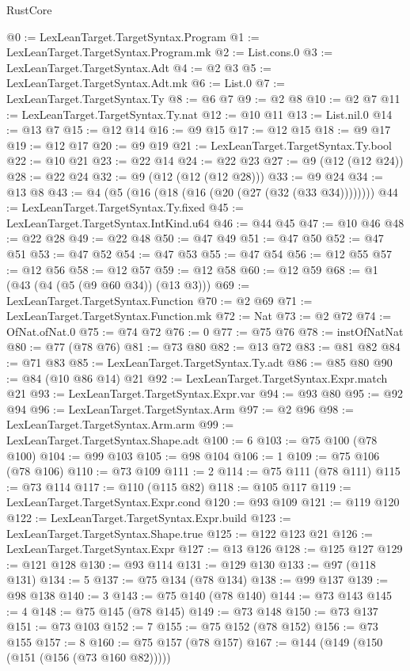 \begin{lexlean}{RustCore}
\begin{coremodule}
@0 := LexLeanTarget.TargetSyntax.Program
@1 := LexLeanTarget.TargetSyntax.Program.mk
@2 := List.cons.{0}
@3 := LexLeanTarget.TargetSyntax.Adt
@4 := @2 @3
@5 := LexLeanTarget.TargetSyntax.Adt.mk
@6 := List.{0}
@7 := LexLeanTarget.TargetSyntax.Ty
@8 := @6 @7
@9 := @2 @8
@10 := @2 @7
@11 := LexLeanTarget.TargetSyntax.Ty.nat
@12 := @10 @11
@13 := List.nil.{0}
@14 := @13 @7
@15 := @12 @14
@16 := @9 @15
@17 := @12 @15
@18 := @9 @17
@19 := @12 @17
@20 := @9 @19
@21 := LexLeanTarget.TargetSyntax.Ty.bool
@22 := @10 @21
@23 := @22 @14
@24 := @22 @23
@27 := @9 (@12 (@12 @24))
@28 := @22 @24
@32 := @9 (@12 (@12 (@12 @28)))
@33 := @9 @24
@34 := @13 @8
@43 := @4 (@5 (@16 (@18 (@16 (@20 (@27 (@32 (@33 @34))))))))
@44 := LexLeanTarget.TargetSyntax.Ty.fixed
@45 := LexLeanTarget.TargetSyntax.IntKind.u64
@46 := @44 @45
@47 := @10 @46
@48 := @22 @28
@49 := @22 @48
@50 := @47 @49
@51 := @47 @50
@52 := @47 @51
@53 := @47 @52
@54 := @47 @53
@55 := @47 @54
@56 := @12 @55
@57 := @12 @56
@58 := @12 @57
@59 := @12 @58
@60 := @12 @59
@68 := @1 (@43 (@4 (@5 (@9 @60 @34)) (@13 @3)))
@69 := LexLeanTarget.TargetSyntax.Function
@70 := @2 @69
@71 := LexLeanTarget.TargetSyntax.Function.mk
@72 := Nat
@73 := @2 @72
@74 := OfNat.ofNat.{0}
@75 := @74 @72
@76 := 0
@77 := @75 @76
@78 := instOfNatNat
@80 := @77 (@78 @76)
@81 := @73 @80
@82 := @13 @72
@83 := @81 @82
@84 := @71 @83
@85 := LexLeanTarget.TargetSyntax.Ty.adt
@86 := @85 @80
@90 := @84 (@10 @86 @14) @21
@92 := LexLeanTarget.TargetSyntax.Expr.match @21
@93 := LexLeanTarget.TargetSyntax.Expr.var
@94 := @93 @80
@95 := @92 @94
@96 := LexLeanTarget.TargetSyntax.Arm
@97 := @2 @96
@98 := LexLeanTarget.TargetSyntax.Arm.arm
@99 := LexLeanTarget.TargetSyntax.Shape.adt
@100 := 6
@103 := @75 @100 (@78 @100)
@104 := @99 @103
@105 := @98 @104
@106 := 1
@109 := @75 @106 (@78 @106)
@110 := @73 @109
@111 := 2
@114 := @75 @111 (@78 @111)
@115 := @73 @114
@117 := @110 (@115 @82)
@118 := @105 @117
@119 := LexLeanTarget.TargetSyntax.Expr.cond
@120 := @93 @109
@121 := @119 @120
@122 := LexLeanTarget.TargetSyntax.Expr.build
@123 := LexLeanTarget.TargetSyntax.Shape.true
@125 := @122 @123 @21
@126 := LexLeanTarget.TargetSyntax.Expr
@127 := @13 @126
@128 := @125 @127
@129 := @121 @128
@130 := @93 @114
@131 := @129 @130
@133 := @97 (@118 @131)
@134 := 5
@137 := @75 @134 (@78 @134)
@138 := @99 @137
@139 := @98 @138
@140 := 3
@143 := @75 @140 (@78 @140)
@144 := @73 @143
@145 := 4
@148 := @75 @145 (@78 @145)
@149 := @73 @148
@150 := @73 @137
@151 := @73 @103
@152 := 7
@155 := @75 @152 (@78 @152)
@156 := @73 @155
@157 := 8
@160 := @75 @157 (@78 @157)
@167 := @144 (@149 (@150 (@151 (@156 (@73 @160 @82)))))

\end{coremodule}
\end{lexlean}
